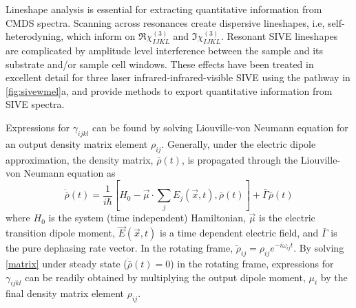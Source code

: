 \documentclass[aip, jcp, reprint, onecolumn]{revtex4-2}
\begin{document}
Lineshape analysis is essential for extracting quantitative information from CMDS spectra.
Scanning across resonances create dispersive lineshapes, i.e, self-heterodyning, which inform on $\Re{\chi^{(3)}_{IJKL}}$ and $\Im{\chi^{(3)}_{IJKL}}$.\cite{Levenson1974_1, Levenson1974_2}
Resonant SIVE lineshapes are complicated by amplitude level interference between the sample and its substrate and/or sample cell windows. \cite{RN362}
These effects have been treated in excellent detail for three laser infrared-infrared-visible SIVE using the pathway in \autoref{fig:sivewmel}a, and provide methods to export quantitative information from SIVE spectra. \cite{RN418}

Expressions for $\gamma_{ijkl}$ can be found by solving Liouville-von Neumann equation for an output density matrix element $\rho_{ij}$.
Generally, under the electric dipole approximation, the density matrix, $\bar{\rho}(t)$, is propagated through the Liouville-von Neumann equation as \cite{RN455}
\begin{equation}\label{matrix}
	\dot{\bar{\rho}}(t) = \frac{1}{i \hbar}[H_0 - \vec{\mu}\cdot \sum_j E_j(\vec{x},t), \bar{\rho}(t)] + \bar{\Gamma} \bar{\rho}(t)
\end{equation} %
where $H_0$ is the system (time independent) Hamiltonian, $\vec{\mu}$ is the electric transition dipole moment, $\vec{E}(\vec{x},t)$ is a time dependent electric field, and $\bar{\Gamma}$ is the pure dephasing rate vector. 
In the rotating frame, $\tilde{\rho}_{ij} = \rho_{ij} e^{-i \omega_{ij}t}$.
By solving \autoref{matrix} under steady state ($\dot{\bar{\rho}}(t) = 0$) in the rotating frame, expressions for $\gamma_{ijkl}$ can be readily obtained by multiplying the output dipole moment, $\mu_i$ by the final density matrix element $\rho_{ij}$. 
\end{document}
